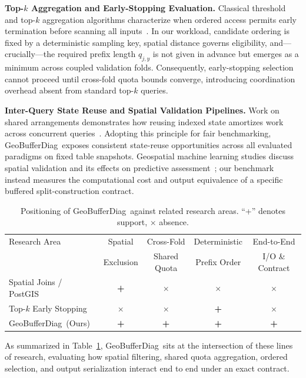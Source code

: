 \documentclass[sigconf, nonacm]{acmart}
\newcommand{\sys}{GeoBufferDiag}
\newcommand{\cmark}{\textbf{+}}
\begin{document}
\textbf{Top-$k$ Aggregation and Early-Stopping Evaluation.} Classical threshold and top-$k$ aggregation algorithms characterize when ordered access permits early termination before scanning all inputs~\cite{fagin2003,ilyas2008}. In our workload, candidate ordering is fixed by a deterministic sampling key, spatial distance governs eligibility, and---crucially---the required prefix length $q_{j,y}$ is not given in advance but emerges as a minimum across coupled validation folds. Consequently, early-stopping selection cannot proceed until cross-fold quota bounds converge, introducing coordination overhead absent from standard top-$k$ queries.

\textbf{Inter-Query State Reuse and Spatial Validation Pipelines.} Work on shared arrangements demonstrates how reusing indexed state amortizes work across concurrent queries~\cite{mcsherry2020}. Adopting this principle for fair benchmarking, \sys\ exposes consistent state-reuse opportunities across all evaluated paradigms on fixed table snapshots. Geospatial machine learning studies discuss spatial validation and its effects on predictive assessment~\cite{roberts2017,ploton2020}; our benchmark instead measures the computational cost and output equivalence of a specific buffered split-construction contract.

\begin{table}[t]
\caption{Positioning of \sys\ against related research areas. ``+'' denotes support, $\times$ absence.}
\label{tab:positioning}\centering\scriptsize
\setlength{\tabcolsep}{3pt}
\begin{tabular}{lcccc}\toprule
Research Area & Spatial & Cross-Fold & Deterministic & End-to-End\\
& Exclusion & Shared Quota & Prefix Order & I/O \& Contract\\\midrule
Spatial Joins / PostGIS~\cite{brinkhoff1993,roussopoulos1995,postgis} & \cmark & $\times$ & $\times$ & $\times$\\
Top-$k$ Early Stopping~\cite{fagin2003} & $\times$ & $\times$ & \cmark & $\times$\\
\sys\ (Ours) & \cmark & \cmark & \cmark & \cmark\\\bottomrule
\end{tabular}
\end{table}

As summarized in Table~\ref{tab:positioning}, \sys\ sits at the intersection of these lines of research, evaluating how spatial filtering, shared quota aggregation, ordered selection, and output serialization interact end to end under an exact contract.
\end{document}

